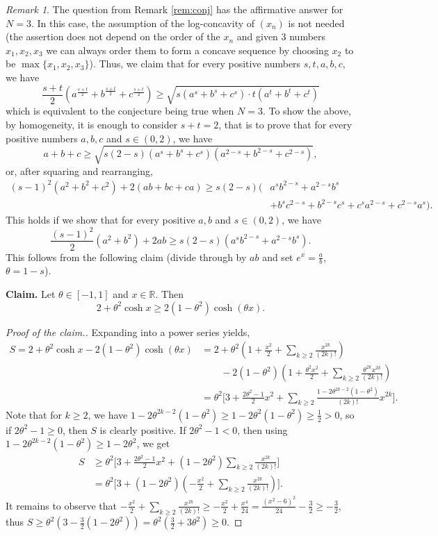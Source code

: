 \documentclass[10pt]{article}
\newcommand{\1}{\textbf{1}}
\newcommand{\R}{\mathbb{R}}
\theoremstyle{remark}
\newtheorem{remark}[theorem]{Remark}
\theoremstyle{definition}
\begin{document}
\begin{remark}\label{rem:conj-N=3}
The question from Remark \ref{rem:conj} has the affirmative answer for $N=3$. In this case, the assumption of the log-concavity of $(x_n)$ is not needed (the assertion does not depend on the order of the $x_n$ and given $3$ numbers $x_1, x_2, x_3$ we can always order them to form a concave sequence by choosing $x_2$ to be $\max\{x_1,x_2,x_3\}$). Thus, we claim that for every positive numbers $s, t, a, b, c$, we have
\[
\frac{s+t}{2}(a^{\frac{s+t}{2}}+b^{\frac{s+t}{2}}+c^{\frac{s+t}{2}}) \geq \sqrt{s(a^s+b^s+c^s)\cdot t(a^t+b^t+c^t)}
\]
which is equivalent to the conjecture being true when $N=3$. To show the above, by homogeneity, it is enough to consider $s+t=2$, that is to prove that for every positive numbers $a, b, c$ and $s \in (0,2)$, we have
\[
a+b+c \geq \sqrt{s(2-s)(a^s+b^s+c^s)(a^{2-s}+b^{2-s}+c^{2-s})},
\]
or, after squaring and rearranging,
\begin{align*}
(s-1)^2(a^2+b^2+c^2) + 2(ab+bc+ca) \geq s(2-s)\Big(&a^sb^{2-s}+a^{2-s}b^s\\
&+b^sc^{2-s}+b^{2-s}c^s+c^sa^{2-s}+c^{2-s}a^s\Big).
\end{align*}
This holds if we show that for every positive $a, b$ and $s \in (0,2)$, we have
\[
\frac{(s-1)^2}{2}(a^2+b^2) + 2ab \geq s(2-s)(a^sb^{2-s}+a^{2-s}b^s).
\]
This follows from the following claim (divide through by $ab$ and set $e^x = \frac{a}{b}$, $\theta = 1-s$).

\bigskip\noindent
\textbf{Claim.} Let $\theta \in [-1,1]$ and $x \in \R$. Then
\[
2 + \theta^2\cosh x \geq 2(1-\theta^2)\cosh(\theta x).
\]
\begin{proof}[Proof of the claim.]
Expanding into a power series yields,
\begin{align*}
S = 2 + \theta^2\cosh x - 2(1-\theta^2)\cosh(\theta x) &= 2 + \theta^2\left(1 + \frac{x^2}{2} + \sum_{k \geq 2} \frac{x^{2k}}{(2k)!}\right) \\
&\qquad- 2(1-\theta^2)\left(1 + \frac{\theta^2x^2}{2} + \sum_{k \geq 2} \frac{\theta^{2k}x^{2k}}{(2k)!}\right) \\
&= \theta^2\Bigg[3 + \frac{2\theta^2-1}{2}x^2 + \sum_{k\geq 2}\frac{1-2\theta^{2k-2}(1-\theta^2)}{(2k)!}x^{2k}\Bigg].
\end{align*}
Note that for $k \geq 2$, we have $1 - 2\theta^{2k-2}(1-\theta^2) \geq 1 - 2\theta^2(1-\theta^2) \geq \frac{1}{2} > 0$, so if $2\theta^2 - 1 \geq 0$, then $S$ is clearly positive. If $2\theta^2 -1 < 0$, then using $1 - 2\theta^{2k-2}(1-\theta^2) \geq 1 - 2\theta^2$, we get
\begin{align*}
S &\geq \theta^2\Bigg[3 + \frac{2\theta^2-1}{2}x^2 + (1-2\theta^2)\sum_{k\geq 2}\frac{x^{2k}}{(2k)!}\Bigg] \\
&= \theta^2\Bigg[3 + (1-2\theta^2)\left(-\frac{x^2}{2} + \sum_{k\geq 2}\frac{x^{2k}}{(2k)!}\right)\Bigg].
\end{align*}
It remains to observe that $-\frac{x^2}{2} + \sum_{k\geq 2}\frac{x^{2k}}{(2k)!} \geq -\frac{x^2}{2} + \frac{x^4}{24} = \frac{(x^2-6)^2}{24} - \frac32 \geq -\frac32$, thus $S \geq \theta^2(3-\frac32(1-2\theta^2)) = \theta^2(\frac32+3\theta^2) \geq 0$.
\end{proof}
\end{remark}
\end{document}
